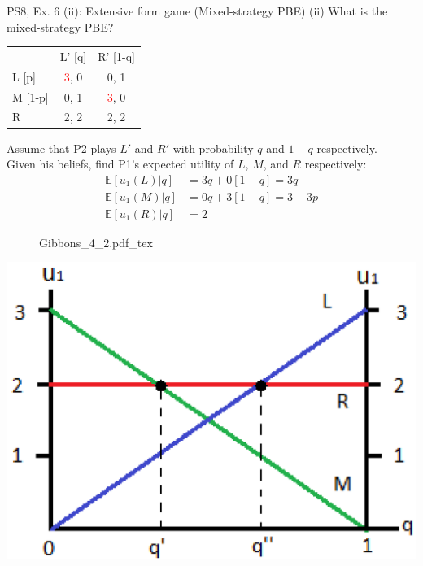 \begin{frame}{PS8, Ex. 6 (ii): Extensive form game (Mixed-strategy PBE)}
    (ii) What is the mixed-strategy PBE? \vspace{-8pt}
    \begin{multicols}{2}
      \begin{table}
        \begin{tabular}{l|c|c|}
          \multicolumn{1}{c}{} & \multicolumn{1}{c}{L' [q]} & \multicolumn{1}{c}{R' [1-q]} \\\cline{2-3}
          L [p]   & \textcolor{red}{3}, 0 & 0, \color{blue}1 \\\cline{2-3}
          M [1-p] & 0, \color{blue}1 & \textcolor{red}{3}, 0 \\\cline{2-3}
          R       & 2, \color{blue}2 & 2, \color{blue}2 \\\cline{2-3}
        \end{tabular}
      \end{table} \vspace{-4pt}
      Assume that P2 plays $L'$ and $R'$ with probability $q$ and $1-q$ respectively.\\\smallskip
      Given his beliefs, find P1's expected utility of $L$, $M$, and $R$ respectively: \vspace{-4pt}
      \begin{align*}
        \mathbb{E}[u_1(L)|q]&=3q+0[1-q]=3q\\
        \mathbb{E}[u_1(M)|q]&=0q+3[1-q]=3-3p\\
        \mathbb{E}[u_1(R)|q]&=2
      \end{align*}
      \vfill\null\columnbreak
      \begin{figure}[!h]
        \center {}
        {Gibbons_4_2.pdf_tex}
      \end{figure}
      \includegraphics[width=1.1\columnwidth]{figures/Gibbons_4_2_E[u]}
      \vfill\null
    \end{multicols}
\end{frame}
